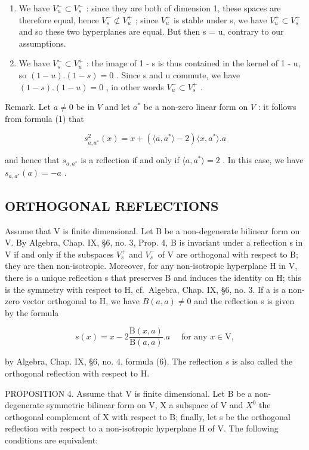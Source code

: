\begin{enumerate}
\def\labelenumi{\alph{enumi})}
\item
  We have \(V_{u}^{-} \subset V_{s}^{-}\) : since they are both of dimension 1, these spaces are therefore equal, hence \(V_{s}^{-} \not\subset V_{u}^{+}\) ; since \(V_{u}^{+}\) is stable under s, we have \(V_{u}^{+} \subset V_{s}^{+}\) and so these two hyperplanes are equal. But then s = u, contrary to our assumptions.
\item
  We have \(V_{s}^{-} \subset V_{u}^{+}\) : the image of 1 - s is thus contained in the kernel of 1 - u, so \((1 - u).(1 - s) = 0\) . Since s and u commute, we have \((1 - s).(1 - u) = 0\) , in other words \(V_{u}^{-} \subset V_{s}^{+}\) .
\end{enumerate}

Remark. Let \(a \neq 0\) be in \(V\) and let \(a^*\) be a non-zero linear form on \(V\) : it follows from formula (1) that

\[
s _ {a, a ^ {*}} ^ {2} (x) = x + \left(\langle a, a ^ {*} \rangle - 2\right) \langle x, a ^ {*} \rangle . a
\]

and hence that \(s_{a,a^*}\) is a reflection if and only if \(\langle a, a^* \rangle = 2\) . In this case, we have \(s_{a,a^*}(a) = -a\) .

\subsection{ORTHOGONAL REFLECTIONS}

Assume that V is finite dimensional. Let B be a non-degenerate bilinear form on V. By Algebra, Chap. IX, §6, no. 3, Prop. 4, B is invariant under a reflection s in V if and only if the subspaces \(V_{s}^{+}\) and \(V_{s}^{-}\) of V are orthogonal with respect to B; they are then non-isotropic. Moreover, for any non-isotropic hyperplane H in V, there is a unique reflection s that preserves B and induces the identity on H; this is the symmetry with respect to H, cf.~Algebra, Chap. IX, §6, no. 3. If a is a non-zero vector orthogonal to H, we have \(B(a,a)\neq0\) and the reflection s is given by the formula

\[
s (x) = x - 2 \frac {\mathrm{B} (x , a)}{\mathrm{B} (a , a)}. a \quad \text { for   any } x \in \mathrm{V},\tag{4}
\]

by Algebra, Chap. IX, §6, no. 4, formula (6). The reflection \(s\) is also called the orthogonal reflection with respect to H.

PROPOSITION 4. Assume that V is finite dimensional. Let B be a non-degenerate symmetric bilinear form on V, X a subspace of V and \(X^{0}\) the orthogonal complement of X with respect to B; finally, let s be the orthogonal reflection with respect to a non-isotropic hyperplane H of V. The following conditions are equivalent:

